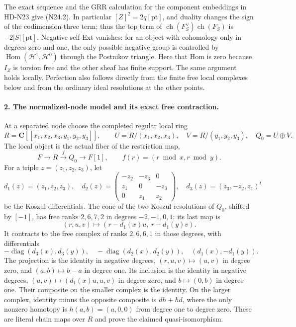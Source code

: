 The exact sequence and the GRR calculation for the component
embeddings in HD-N23 give (N24.2). In particular
$[Z]^2=2q[\mathrm{pt}]$, and duality changes the sign of the
codimension-three term; thus the top term of
$\operatorname{ch}(F_S^\vee)\operatorname{ch}(F_S)$ is
$-2|S|[\mathrm{pt}]$. Negative self-Ext vanishes: for an
object with cohomology only in degrees zero and one, the only
possible negative group is controlled by
$\operatorname{Hom}(\mathcal H^1,\mathcal H^0)$ through the
Postnikov triangle. Here that Hom is zero because $I_Z$ is
torsion free and the other sheaf has finite support. The same
argument holds locally. Perfection also follows directly from
the finite free local complexes below and from the ordinary
ideal resolutions at the other points.

\paragraph{2. The normalized-node model and its exact free contraction.}
At a separated node choose the completed regular local ring
\[
 R=\mathbf C[[x_1,x_2,x_3,y_1,y_2,y_3]],\qquad
 U=R/(x_1,x_2,x_3),\quad V=R/(y_1,y_2,y_3),\quad Q_0=U\oplus V.
                                                               \tag{N24.6}
\]
The local object is the actual fiber of the restriction map,
\[
             F\longrightarrow R\xrightarrow{f}Q_0
                    \longrightarrow F[1],\qquad
             f(r)=(r\bmod x,r\bmod y).                    \tag{N24.7}
\]
For a triple $z=(z_1,z_2,z_3)$, let
\[
 d_1(z)=(z_1,z_2,z_3),\quad
 d_2(z)=\begin{pmatrix}-z_2&-z_3&0\\z_1&0&-z_3\\0&z_1&z_2\end{pmatrix},
 \quad d_3(z)=(z_3,-z_2,z_1)^t                              \tag{N24.8}
\]
be the Koszul differentials. The cone of the two Koszul
resolutions of $Q_0$, shifted by $[-1]$, has free ranks
$2,6,7,2$ in degrees $-2,-1,0,1$; its last map is
\[
                  (r,u,v)\longmapsto
                   (r-d_1(x)u,\ r-d_1(y)v).                \tag{N24.9}
\]
It contracts to the free complex of ranks $2,6,6,1$ in those
degrees, with differentials
\[
 -\operatorname{diag}(d_3(x),d_3(y)),\quad
 -\operatorname{diag}(d_2(x),d_2(y)),\quad
                         (d_1(x),-d_1(y)).                 \tag{N24.10}
\]
The projection is the identity in negative degrees,
$(r,u,v)\mapsto(u,v)$ in degree zero, and
$(a,b)\mapsto b-a$ in degree one. Its inclusion is the identity
in negative degrees, $(u,v)\mapsto(d_1(x)u,u,v)$ in degree
zero, and $b\mapsto(0,b)$ in degree one. Their composite on
the smaller complex is the identity. On the larger complex,
identity minus the opposite composite is $dh+hd$, where the
only nonzero homotopy is
$h(a,b)=(a,0,0)$ from degree one to degree zero.
These are literal chain maps over $R$ and prove the claimed
quasi-isomorphism.

